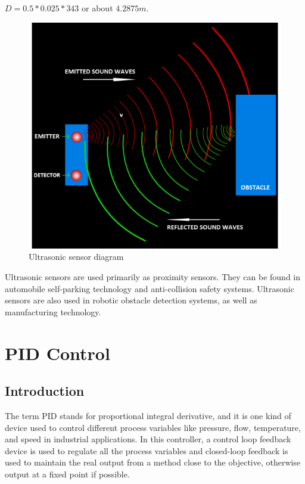 $D = 0.5 * 0.025 * 343$
or about $4.2875m$.

\begin{figure}[h!]
     \centering
         \centering
         \includegraphics[scale=0.5]{./Figures/AppendixB/ultra1.png}
         \caption{Ultrasonic sensor diagram}
         \label{fig: Ultrasonic sensor diagram}
         
\end{figure}
Ultrasonic sensors are used primarily as proximity sensors. They can be found in automobile self-parking technology and anti-collision safety systems. Ultrasonic sensors are also used in robotic obstacle detection systems, as well as manufacturing technology.


\section{PID Control}
\label{ap:b.pid}
\subsection{Introduction}
The term PID stands for proportional integral derivative, and it is one kind of device used to control different process variables like pressure, flow, temperature, and speed in industrial applications. In this controller, a control loop feedback device is used to regulate all the process variables and closed-loop feedback is used to maintain the real output from a method close to the objective, otherwise output at a fixed point if possible.\\


